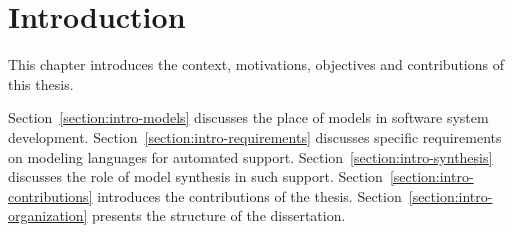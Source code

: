 \chapter{Introduction\label{chap:introduction}}

This chapter introduces the context, motivations, objectives and contributions of this thesis.

Section~\ref{section:intro-models} discusses the place of models in software system development. Section~\ref{section:intro-requirements} discusses specific requirements on modeling languages for automated support. Section~\ref{section:intro-synthesis} discusses the role of model synthesis in such support. Section~\ref{section:intro-contributions} introduces the contributions of the thesis. Section~\ref{section:intro-organization} presents the structure of the dissertation.







